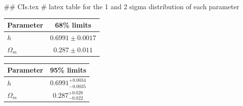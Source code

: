 ## CIs.tex
# latex table for the 1 and 2 sigma distribution of each parameter

\begin{tabular} { l  c}
 Parameter &  68\% limits\\
\hline
{\boldmath$h              $} & $0.6991\pm 0.0017          $\\
{\boldmath$\Omega_m       $} & $0.287\pm 0.011            $\\
\hline
\end{tabular}

\begin{tabular} { l  c}
 Parameter &  95\% limits\\
\hline
{\boldmath$h              $} & $0.6991^{+0.0034}_{-0.0035}$\\
{\boldmath$\Omega_m       $} & $0.287^{+0.028}_{-0.022}   $\\
\hline
\end{tabular}
